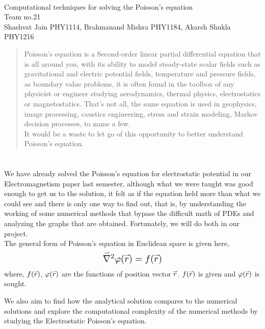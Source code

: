 \documentclass[letterpaper,11pt]{article}
\newcommand{\newsection}[1]{\section{\sffamily{\bfseries{#1}}}}
\newcommand{\myvec}[1]{\accentset{\rightharpoonup}{#1}}
\begin{document}
	
	\begin{center}
		 \\[4mm]
		\large{Computational techniques for solving the Poisson’s equation} \\[4mm]
		\large{\textcolor{greyish}{Team no.21}} \\[1mm]
		\large{\textcolor{greyish}{Shashvat Jain PHY1114, Brahmanand Mishra PHY1184, Akarsh Shukla PHY1216}}\\[3mm]
		\begin{abstract}
			\noindent
			Poisson's equation is a Second-order linear partial differential equation that is all around you, with its ability to model steady-state scalar fields such as gravitational and electric potential fields, temperature and pressure fields, as boundary value problems, it is often found in the toolbox of any physicist or engineer studying aerodynamics, thermal physics, electrostatics or magnetostatics. That’s not all, the same equation is used in geophysics, image processing, caustics engineering, stress and strain modeling, Markov decision processes, to name a few.\\ \noindent
			It would be a waste to let go of this opportunity to better understand Poisson's equation.  
		\end{abstract}	
	\end{center}
	
	\newsection{PROJECT SYNOPSIS}
	\noindent
	We have already solved the Poisson’s equation for electrostatic potential in our Electromagnetism paper last semester, although what we were taught was good enough to get us to the solution, it felt as if the equation held more than what we could see and there is only one way to find out, that is, by understanding the working of some numerical methods that bypass the difficult math of PDEs and analyzing the graphs that are obtained. Fortunately, we will do both in our project.\\
	The general form of Poisson's equation in Euclidean space is given here,
	\[
	\scalebox{1.3}{$\myvec{\nabla}^2 \varphi(\myvec{r}) = f(\myvec{r})$}
	\]
	where, $f(\myvec{r})$, $\varphi(\myvec{r})$ are the functions of position vector $\myvec{r}$. $f(\myvec{r})$ is given and $\varphi(\myvec{r})$ is sought. 
	\noindent

	\noindent
	We also aim to find how the analytical solution compares to the numerical solutions and explore the computational complexity of the numerical methods by studying the Electrostatic Poisson’s equation. 
	
\end{document}
